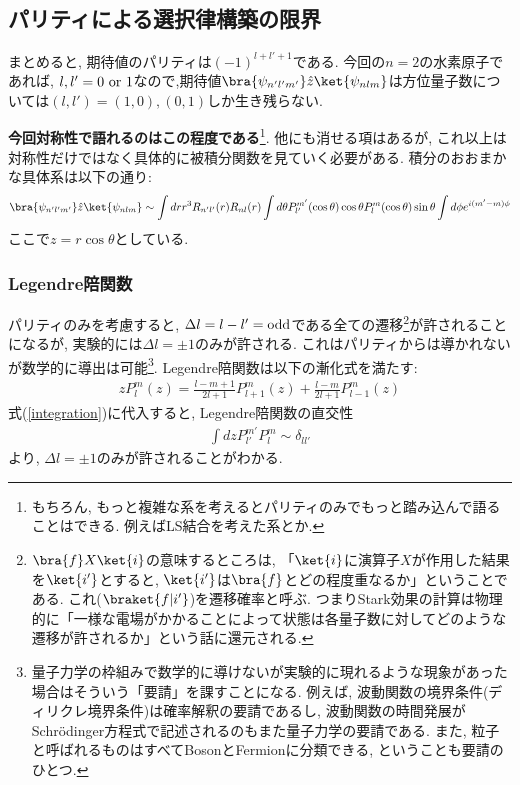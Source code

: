 \documentclass[10.5pt,a4paper]{jreport}
\begin{document}
\subsection{パリティによる選択律構築の限界}
まとめると, 期待値のパリティは$(-1)^{l+l'+1}$である. 今回の$n=2$の水素原子であれば, $l, l' = 0\ {\rm or}\ 1$なので,期待値$\bra{\psi_{n'l'm'}}\hat{z}\ket{\psi_{nlm}}$は方位量子数については$(l, l')= (1, 0), (0, 1)$しか生き残らない.

\textbf{今回対称性で語れるのはこの程度である}\footnote{もちろん, もっと複雑な系を考えるとパリティのみでもっと踏み込んで語ることはできる. 例えばLS結合を考えた系とか.}. 他にも消せる項はあるが, これ以上は対称性だけではなく具体的に被積分関数を見ていく必要がある. 積分のおおまかな具体系は以下の通り:
\begin{eqnarray}
  \nonumber  \bra{\psi_{n'l'm'}}\hat{z}\ket{\psi_{nlm}} \sim \int dr r^3R_{n'l'}(r)R_{nl}(r)\int d\theta P_{l'}^{m'}(\cos{\theta})\cos{\theta}P_l^m(\cos{\theta})\sin{\theta}\int d\phi e^{i(m'-m)\phi}\\
  \label{integration}
\end{eqnarray}
ここで$z = r\cos{\theta}$としている.
\subsubsection{Legendre陪関数}
パリティのみを考慮すると, $\Delta l = l - l' = {\rm odd}$である全ての遷移\footnote{$\bra{f}X\ket{i}$の意味するところは, 「$\ket{i}$に演算子$X$が作用した結果を$\ket{i'}$とすると, $\ket{i'}$は$\bra{f}$とどの程度重なるか」ということである. これ($\braket{f|i'}$)を遷移確率と呼ぶ. つまりStark効果の計算は物理的に「一様な電場がかかることによって状態は各量子数に対してどのような遷移が許されるか」という話に還元される.}が許されることになるが, 実験的には$\Delta l = \pm 1$のみが許される. これはパリティからは導かれないが数学的に導出は可能\footnote{量子力学の枠組みで数学的に導けないが実験的に現れるような現象があった場合はそういう「要請」を課すことになる. 例えば, 波動関数の境界条件(ディリクレ境界条件)は確率解釈の要請であるし, 波動関数の時間発展がSchr\"odinger方程式で記述されるのもまた量子力学の要請である. また, 粒子と呼ばれるものはすべてBosonとFermionに分類できる, ということも要請のひとつ.}. Legendre陪関数は以下の漸化式を満たす:
\begin{eqnarray}
  zP_l^m(z) = \frac{l-m+1}{2l+1}P_{l+1}^m(z) + \frac{l-m}{2l+1}P_{l-1}^{m}(z)
\end{eqnarray}
式(\ref{integration})に代入すると, Legendre陪関数の直交性
\begin{eqnarray}
  \int dzP_{l'}^{m'}P_l^m \sim \delta_{ll'}
\end{eqnarray}
より, $\Delta l = \pm 1$のみが許されることがわかる.
\end{document}
